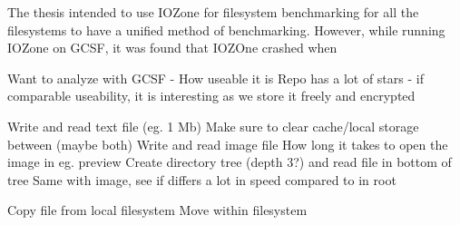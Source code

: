 
The thesis intended to use IOZone for filesystem benchmarking for all the filesystems to have a unified method of benchmarking. However, while running IOZone on GCSF, it was found that IOZOne crashed when  

Want to analyze with GCSF - How useable it is
Repo has a lot of stars - if comparable useability, it is interesting as we store it freely and encrypted

Write and read text file (eg. 1 Mb)
	Make sure to clear cache/local storage between (maybe both)
Write and read image file
	How long it takes to open the image in eg. preview
Create directory tree (depth 3?) and read file in bottom of tree
	Same with image, see if differs a lot in speed compared to in root

Copy file from local filesystem
Move within filesystem 